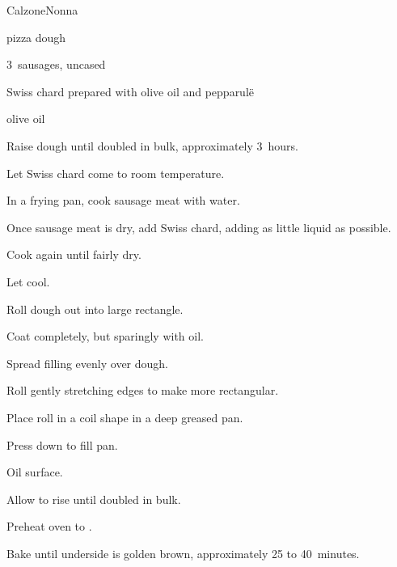 \begin{recipe}{Calzone}{Nonna}{}

\begin{ingredients}
\item pizza dough
\item 3~sausages, uncased
\item Swiss chard prepared with olive oil and pepparul\"e
\item olive oil
\end{ingredients}

\begin{directions}
\item Raise dough until doubled in bulk, approximately 3~hours.
\item Let Swiss chard come to room temperature.
\item In a frying pan, cook sausage meat with \C{\quarter} water.
\item Once sausage meat is dry, add Swiss chard, adding as little liquid as possible.
\item Cook again until fairly dry.
\item Let cool.
\item Roll dough out into large rectangle.
\item Coat completely, but sparingly with oil.
\item Spread filling evenly over dough.
\item Roll gently stretching edges to make more rectangular.
\item Place roll in a coil shape in a deep greased pan.
\item Press down to fill pan.
\item Oil surface.
\item Allow to rise until doubled in bulk.
\item Preheat oven to .
\item Bake until underside is golden brown, approximately 25 to 40~minutes.
\end{directions}

\end{recipe}
